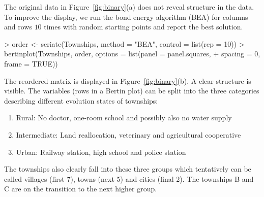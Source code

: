 \documentclass[fleqn, a4paper]{article}
\begin{document}
The original data in Figure~\ref{fig:binary}(a) does not reveal structure in
the data. To improve the display, we run the  bond energy algorithm (BEA) for
columns and rows $10$ times with random starting points and report the best
solution. 


\begin{Schunk}
\begin{Sinput}
> order <- seriate(Townships, method = "BEA", control = list(rep = 10))
> bertinplot(Townships, order, options = list(panel = panel.squares, 
+     spacing = 0, frame = TRUE))
\end{Sinput}
\end{Schunk}

The reordered matrix is displayed in Figure~\ref{fig:binary}(b).  A
clear structure is visible.  The variables (rows in a Bertin plot) can be
split into the three categories describing different evolution states of
townships:
\begin{enumerate}
    \item Rural: No doctor, one-room school and possibly also
        no water supply
    \item Intermediate: Land reallocation, veterinary and agricultural 
        cooperative
    \item Urban: Railway station, high school and police station
\end{enumerate}

The townships also clearly fall into these three groups which tentatively can
be called villages (first $7$), towns (next 5) and cities (final 2).  The
townships B and C are on the transition to the next higher group.
\end{document}
